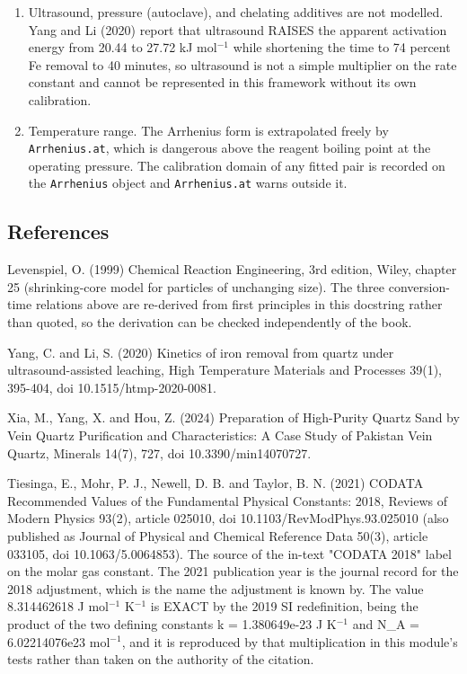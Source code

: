 \documentclass[10pt,a4paper,twoside]{report}
\begin{document}
\begin{enumerate}[leftmargin=*,label=\arabic*.]
\item Ultrasound, pressure (autoclave), and chelating additives are not modelled. Yang and Li (2020) report that ultrasound RAISES the apparent activation energy from 20.44 to 27.72 kJ mol$^{-1}$ while shortening the time to 74 percent Fe removal to 40 minutes, so ultrasound is not a simple multiplier on the rate constant and cannot be represented in this framework without its own calibration.
\item Temperature range. The Arrhenius form is extrapolated freely by \texttt{Arrhenius.at}, which is dangerous above the reagent boiling point at the operating pressure. The calibration domain of any fitted pair is recorded on the \texttt{Arrhenius} object and \texttt{Arrhenius.at} warns outside it.
\end{enumerate}

\subsection*{References}

Levenspiel, O. (1999) Chemical Reaction Engineering, 3rd edition, Wiley, chapter 25 (shrinking-core model for particles of unchanging size). The three conversion-time relations above are re-derived from first principles in this docstring rather than quoted, so the derivation can be checked independently of the book.

Yang, C. and Li, S. (2020) Kinetics of iron removal from quartz under ultrasound-assisted leaching, High Temperature Materials and Processes 39(1), 395-404, doi 10.1515/htmp-2020-0081.

Xia, M., Yang, X. and Hou, Z. (2024) Preparation of High-Purity Quartz Sand by Vein Quartz Purification and Characteristics: A Case Study of Pakistan Vein Quartz, Minerals 14(7), 727, doi 10.3390/min14070727.

Tiesinga, E., Mohr, P. J., Newell, D. B. and Taylor, B. N. (2021) CODATA Recommended Values of the Fundamental Physical Constants: 2018, Reviews of Modern Physics 93(2), article 025010, doi 10.1103/RevModPhys.93.025010 (also published as Journal of Physical and Chemical Reference Data 50(3), article 033105, doi 10.1063/5.0064853). The source of the in-text "CODATA 2018" label on the molar gas constant. The 2021 publication year is the journal record for the 2018 adjustment, which is the name the adjustment is known by. The value 8.314462618 J mol$^{-1}$ K$^{-1}$ is EXACT by the 2019 SI redefinition, being the product of the two defining constants k = 1.380649e-23 J K$^{-1}$ and N\_A = 6.02214076e23 mol$^{-1}$, and it is reproduced by that multiplication in this module's tests rather than taken on the authority of the citation.
\end{document}
